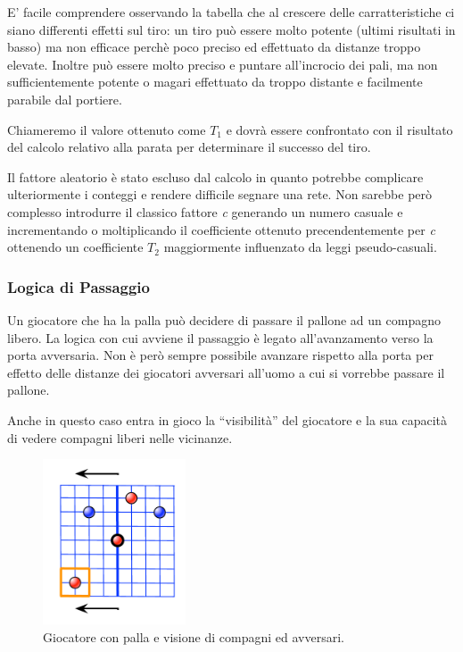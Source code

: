 \documentclass[aps,letterpaper,10pt]{article}
\begin{document}
E' facile comprendere osservando la tabella che al crescere delle carratteristiche ci siano differenti effetti sul tiro:
un tiro pu\`o essere molto potente (ultimi risultati in basso) ma non efficace perch\`e poco preciso ed effettuato da
distanze troppo elevate. Inoltre pu\`o essere molto preciso e puntare all'incrocio dei pali, ma non sufficientemente
potente o magari effettuato da troppo distante e facilmente parabile dal portiere. \vspace{3mm}

Chiameremo il valore ottenuto come $T_1$ e dovr\`a essere confrontato con il risultato del calcolo relativo alla parata
per determinare il successo del tiro. \vspace{3mm}

Il fattore aleatorio \`e stato escluso dal calcolo in quanto potrebbe complicare ulteriormente i conteggi e rendere
difficile segnare una rete. Non sarebbe per\`o complesso introdurre il classico fattore \emph{c} generando un numero
casuale e incrementando o moltiplicando il coefficiente ottenuto precendentemente per \emph{c} ottenendo un coefficiente
$T_2$ maggiormente influenzato da leggi pseudo-casuali.

\subsubsection{Logica di Passaggio}

Un giocatore che ha la palla pu\`o decidere di passare il pallone ad un compagno libero. La logica con cui avviene il
passaggio \`e legato all'avanzamento verso la porta avversaria. Non \`e per\`o sempre possibile avanzare rispetto alla
porta per effetto delle distanze dei giocatori avversari all'uomo a cui si vorrebbe passare il pallone. \vspace{3mm}

Anche in questo caso entra in gioco la ``visibilit\`a'' del giocatore e la sua capacit\`a di vedere compagni liberi
nelle vicinanze.

\begin{figure}[H]
	\begin{center}
		\includegraphics[width=160px]{images/vision2.pdf}
	\end{center}
\caption{Giocatore con palla e visione di compagni ed avversari.}
\end{figure}
\end{document}
